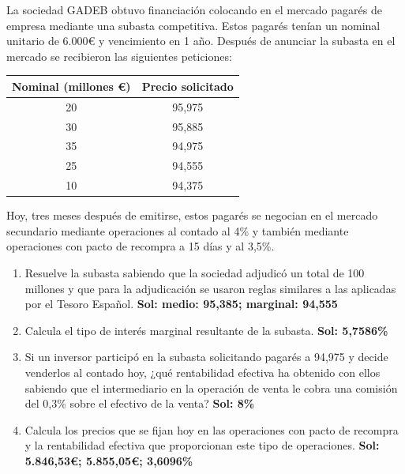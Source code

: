La sociedad GADEB obtuvo financiación colocando en el mercado pagarés de empresa mediante una subasta competitiva. Estos pagarés tenían un nominal unitario de 6.000€ y vencimiento en 1 año. Después de anunciar la subasta en el mercado se recibieron las siguientes peticiones:

\begin{table}[H]
    \centering
    \begin{tabular}{|c|c|}
        \hline
        \textbf{Nominal (millones €)} & \textbf{Precio solicitado} \\ \hline
        20 & 95,975 \\ \hline
        30 & 95,885 \\ \hline
        35 & 94,975 \\ \hline
        25 & 94,555 \\ \hline
        10 & 94,375 \\ \hline
    \end{tabular}
\end{table}

Hoy, tres meses después de emitirse, estos pagarés se negocian en el mercado secundario mediante operaciones al contado al 4\% y también mediante operaciones con pacto de recompra a 15 días y al 3,5\%.

\begin{enumerate}[label=\textbf{\alph*)}]
    \item Resuelve la subasta sabiendo que la sociedad adjudicó un total de 100 millones y que para la adjudicación se usaron reglas similares a las aplicadas por el Tesoro Español. \textbf{Sol: medio: 95,385; marginal: 94,555}
    
    \item Calcula el tipo de interés marginal resultante de la subasta. \textbf{Sol: 5,7586\%}
    

    \item Si un inversor participó en la subasta solicitando pagarés a 94,975 y decide venderlos al contado hoy, ¿qué rentabilidad efectiva ha obtenido con ellos sabiendo que el intermediario en la operación de venta le cobra una comisión del 0,3\% sobre el efectivo de la venta? \textbf{Sol: 8\%}
    

    \item Calcula los precios que se fijan hoy en las operaciones con pacto de recompra y la rentabilidad efectiva que proporcionan este tipo de operaciones. \textbf{Sol: 5.846,53€; 5.855,05€; 3,6096\%}
    
\end{enumerate}





